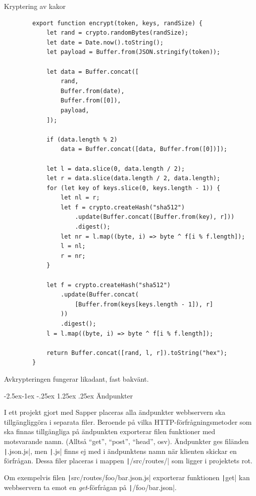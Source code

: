 \documentclass{article}
\makeatletter
\renewcommand*\paragraph{\@startsection{paragraph}{4}{\z@}%
			{-2.5ex\@plus -1ex \@minus -.25ex}%
			{1.25ex \@plus .25ex}%
			{\normalfont\normalsize\bfseries}}
\makeatother
\begin{document}
\begin{listing}[H]
	\caption{Kryptering av kakor}
	\begin{verbatim}
		export function encrypt(token, keys, randSize) {
			let rand = crypto.randomBytes(randSize);
			let date = Date.now().toString();
			let payload = Buffer.from(JSON.stringify(token));

			let data = Buffer.concat([
				rand,
				Buffer.from(date),
				Buffer.from([0]),
				payload,
			]);

			if (data.length % 2)
				data = Buffer.concat([data, Buffer.from([0])]);

			let l = data.slice(0, data.length / 2);
			let r = data.slice(data.length / 2, data.length);
			for (let key of keys.slice(0, keys.length - 1)) {
				let nl = r;
				let f = crypto.createHash("sha512")
					.update(Buffer.concat([Buffer.from(key), r]))
					.digest();
				let nr = l.map((byte, i) => byte ^ f[i % f.length]);
				l = nl;
				r = nr;
			}

			let f = crypto.createHash("sha512")
				.update(Buffer.concat(
					[Buffer.from(keys[keys.length - 1]), r]
				))
				.digest();
			l = l.map((byte, i) => byte ^ f[i % f.length]);

			return Buffer.concat([rand, l, r]).toString("hex");
		}
	\end{verbatim}
\end{listing}

Avkrypteringen fungerar likadant, fast bakvänt.

\paragraph{Ändpunkter}

I ett projekt gjort med Sapper placeras alla ändpunkter webbservern ska
tillgängliggöra i separata filer. Beroende på vilka HTTP-förfrågningsmetoder som
ska finnas tillgängliga på ändpunkten exporterar filen funktioner med
motsvarande namn. (Alltså ``get'', ``post'', ``head'', osv). Ändpunkter ges
filänden \texttt|.json.js|, men
\texttt|.js| finns ej med i ändpunktens namn när
klienten skickar en förfrågan. Dessa filer placeras i mappen
\texttt|/src/routes/| som ligger i projektets rot.

Om exempelvis filen \texttt|src/routes/foo/bar.json.js|
exporterar funktionen \texttt|get| kan webbservern ta
emot en \textit{get}-förfrågan på
\texttt|/foo/bar.json|.
\end{document}
